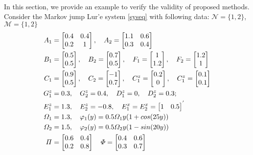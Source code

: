 \documentclass[conference]{IEEEtran}
\begin{document}
In this section, we provide an example to verify the validity of proposed methods. Consider the Markov jump Lur'e system \eqref{syseq} with following data: $\mathcal{N}=\{1,2\}$, $\mathcal{M}=\{1,2\}$
\begin{equation} \notag
	\begin{aligned}
		A_{1}&=\begin{bmatrix}
			0.4&0.4\\
			0.2&1
		\end{bmatrix}, \quad
		A_{2}=\begin{bmatrix}
			1.1&0.6\\
			0.3&0.4
		\end{bmatrix}\\
		B_{1}&=\begin{bmatrix}
		0.5\\0.5
		\end{bmatrix}, \quad
		B_2 = \begin{bmatrix}
		0.7\\0.5
		\end{bmatrix}, \quad
		F_{1}=\begin{bmatrix}
		1\\1.2
		\end{bmatrix},\quad
		F_{2}=\begin{bmatrix}
		1.2\\1
		\end{bmatrix}
		\\
		C_{1}&=\begin{bmatrix}
		0.9\\0.5
		\end{bmatrix},\quad
		C_{2}=\begin{bmatrix}
		-1\\0.7
		\end{bmatrix},\quad
		C^{z}_{1}=\begin{bmatrix}
		0.2\\0
		\end{bmatrix},\quad
		C^{z}_{1}=\begin{bmatrix}
		0.1\\0.1
		\end{bmatrix} \\
		G^{z}_{1}& = 0.3,\quad G^{z}_{2} = 0.4,\quad D^{z}_{1} = 0,\quad D^{z}_{2} = 0.3;\\
		E^{z}_{1}&= 1.3,\quad E^{z}_{2} = -0.8,\quad 	E^{x}_{1} = E^{x}_{2}= \begin{bmatrix} 
			1&0.5
		\end{bmatrix}^{'}\\
		\varOmega_{1}&=1.3, \quad \varphi_{1}(y)=0.5\varOmega_{1}y(1+cos(25y)) \\ 
		\varOmega_{2}&=1.5,\quad \varphi_{2}(y)=0.5\varOmega_{2}y(1-sin(20y)) \\
		\varPi&=\begin{bmatrix}
			0.6&0.4\\
			0.2&0.8
		\end{bmatrix} \quad
		\varPhi=\begin{bmatrix}
			0.4&0.6\\
			0.3&0.7
		\end{bmatrix}
	\end{aligned}  
\end{equation}
\end{document}

